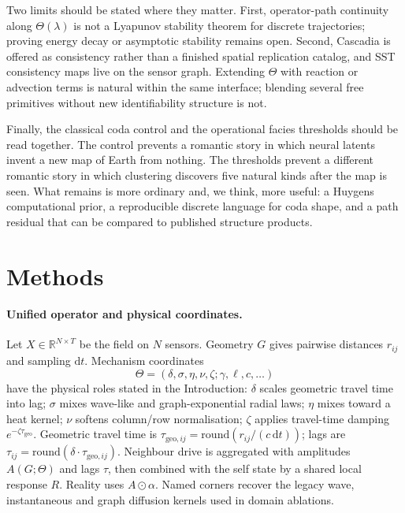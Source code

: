 \documentclass[twocolumn,10pt]{article}
\begin{document}
Two limits should be stated where they matter. First, operator-path continuity
along \(\Theta(\lambda)\) is not a Lyapunov stability theorem for discrete
trajectories; proving energy decay or asymptotic stability remains open.
Second, Cascadia is offered as consistency rather than a finished spatial
replication catalog, and SST consistency maps live on the sensor graph.
Extending \(\Theta\) with reaction or advection terms is natural within the same
interface; blending several free primitives without new identifiability
structure is not.

Finally, the classical coda control and the operational facies thresholds should
be read together. The control prevents a romantic story in which neural latents
invent a new map of Earth from nothing. The thresholds prevent a different
romantic story in which clustering discovers five natural kinds after the map is
seen. What remains is more ordinary and, we think, more useful: a Huygens
computational prior, a reproducible discrete language for coda shape, and a path
residual that can be compared to published structure products.


\section*{Methods}

\paragraph{Unified operator and physical coordinates.}
Let \(X\in\mathbb{R}^{N\times T}\) be the field on \(N\) sensors. Geometry \(G\)
gives pairwise distances \(r_{ij}\) and sampling \(\mathrm{d}t\). Mechanism
coordinates
\[
\Theta=(\delta,\sigma,\eta,\nu,\zeta;\gamma,\ell,c,\ldots)
\]
have the physical roles stated in the Introduction: \(\delta\) scales geometric
travel time into lag; \(\sigma\) mixes wave-like and graph-exponential radial
laws; \(\eta\) mixes toward a heat kernel; \(\nu\) softens column/row
normalisation; \(\zeta\) applies travel-time damping
\(e^{-\zeta\tau_{\mathrm{geo}}}\). Geometric travel time is
\(\tau_{\mathrm{geo},ij}=\mathrm{round}(r_{ij}/(c\,\mathrm{d}t))\); lags are
\(\tau_{ij}=\mathrm{round}(\delta\cdot\tau_{\mathrm{geo},ij})\). Neighbour drive
is aggregated with amplitudes \(A(G;\Theta)\) and lags \(\tau\), then combined
with the self state by a shared local response \(R\). Reality uses
\(A\odot\alpha\). Named corners recover the legacy wave, instantaneous and graph
diffusion kernels used in domain ablations.
\end{document}
